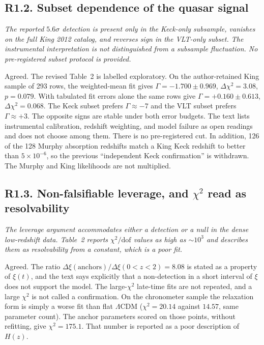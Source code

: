 \documentclass[11pt]{article}
\begin{document}
\subsection*{R1.2. Subset dependence of the quasar signal}

\textit{The reported $5.6\sigma$ detection is present only in the Keck-only subsample, vanishes on the full King 2012 catalog, and reverses sign in the VLT-only subset. The instrumental interpretation is not distinguished from a subsample fluctuation. No pre-registered subset protocol is provided.}

Agreed.
The revised Table~2 is labelled exploratory.
On the author-retained King sample of 293 rows, the weighted-mean fit gives $\Gamma=-1.700\pm0.969$, $\Delta\chi^{2}=3.08$, $p=0.079$.
With tabulated fit errors alone the same rows give $\Gamma=+0.160\pm0.613$, $\Delta\chi^{2}=0.068$.
The Keck subset prefers $\Gamma\approx-7$ and the VLT subset prefers $\Gamma\approx+3$.
The opposite signs are stable under both error budgets.
The text lists instrumental calibration, redshift weighting, and model failure as open readings and does not choose among them.
There is no pre-registered cut.
In addition, 126 of the 128 Murphy absorption redshifts match a King Keck redshift to better than $5\times10^{-6}$, so the previous ``independent Keck confirmation'' is withdrawn.
The Murphy and King likelihoods are not multiplied.

\subsection*{R1.3. Non-falsifiable leverage, and $\chi^{2}$ read as resolvability}

\textit{The leverage argument accommodates either a detection or a null in the dense low-redshift data. Table~2 reports $\chi^{2}/\mathrm{dof}$ values as high as $\sim10^{3}$ and describes them as resolvability from a constant, which is a poor fit.}

Agreed.
The ratio $\Delta\xi(\mathrm{anchors})/\Delta\xi(0<z<2)=8.08$ is stated as a property of $\xi(t)$, and the text says explicitly that a non-detection in a short interval of $\xi$ does not support the model.
The large-$\chi^{2}$ late-time fits are not repeated, and a large $\chi^{2}$ is not called a confirmation.
On the chronometer sample the relaxation form is simply a worse fit than flat $\Lambda$CDM ($\chi^{2}=20.14$ against $14.57$, same parameter count).
The anchor parameters scored on those points, without refitting, give $\chi^{2}=175.1$.
That number is reported as a poor description of $H(z)$.
\end{document}

